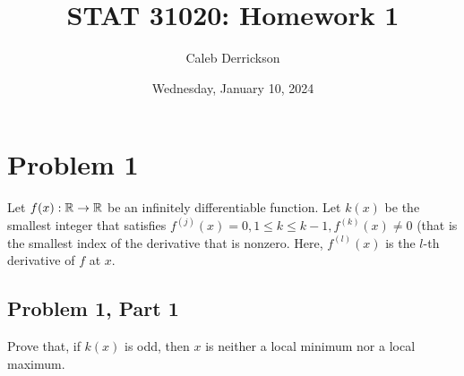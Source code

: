 

\title{STAT 31020: Homework 1}
\author{Caleb Derrickson}
\date{Wednesday, January 10, 2024}


\onehalfspacing
\maketitle
\allowdisplaybreaks

\tableofcontents

\newpage
\section{Problem 1}
Let $f(x): \mathbb{R} \rightarrow \mathbb{R}$ be an infinitely differentiable function. Let $k(x)$ be the smallest integer that satisfies $f^{(j)}(x) = 0, 1 \leq k \leq k - 1, f^{(k)}(x) \neq 0$ (that is the smallest index of the derivative that is nonzero. Here, $f^{(l)}(x)$ is the $l$-th derivative of $f$ at $x$.

\subsection{Problem 1, Part 1}
Prove that, if $k(x)$ is odd, then $x$ is neither a local minimum nor a local maximum. 
\partbreak

